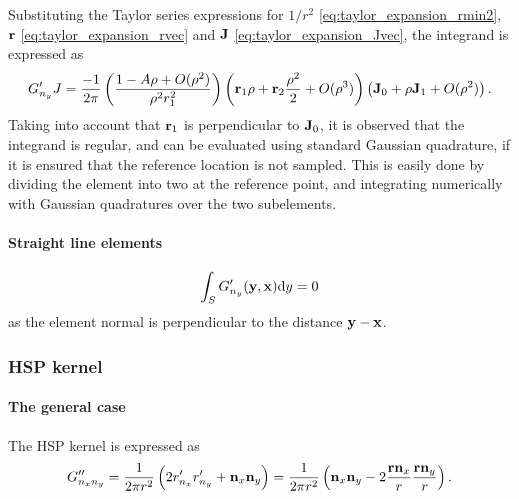 Substituting the Taylor series expressions for $1/r^2$ \eqref{eq:taylor_expansion_rmin2}, ${\bf r}$ \eqref{eq:taylor_expansion_rvec} and ${\bf J}$ \eqref{eq:taylor_expansion_Jvec}, the integrand is expressed as
%
\begin{equation}
	G'_{n_y} J = \frac{-1}{2\pi} \left(\frac{1-A\rho + O(\rho^2)}{\rho^2 r_1^2}\right) 
	\left( {\bf r}_1 \rho + {\bf r}_2 \frac{\rho^2}{2} + O(\rho^3) \right) 
	\left( {\bf J}_0 + \rho {\bf J}_1 + O(\rho^2) \right)
	.
\end{equation}
%
Taking into account that ${\bf r}_1$ is perpendicular to ${\bf J}_0$, it is observed that the integrand is regular, and can be evaluated using standard Gaussian quadrature, if it is ensured that the reference location is not sampled.
This is easily done by dividing the element into two at the reference point, and integrating numerically with Gaussian quadratures over the two subelements.


\paragraph{Straight line elements}

\begin{equation}
\int_{S} G'_{n_y}({\bf y}, {\bf x}) \mathrm{d} y = 0
\end{equation}
%
as the element normal is perpendicular to the distance ${\bf y}-{\bf x}$.



\subsubsection{HSP kernel}

\paragraph{The general case}

The HSP kernel is expressed as
%
\begin{equation}
	G''_{n_x n_y} = \frac{1}{2\pi r^2} \left( 2 r'_{n_x} r'_{n_y} + {\bf n}_x {\bf n}_y \right)
	= \frac{1}{2\pi r^2} \left( {\bf n}_x {\bf n}_y - 2 \frac{{\bf r} {\bf n}_x}{r} \frac{{\bf r}{\bf n}_y}{r} \right)
	.
\end{equation}
%

